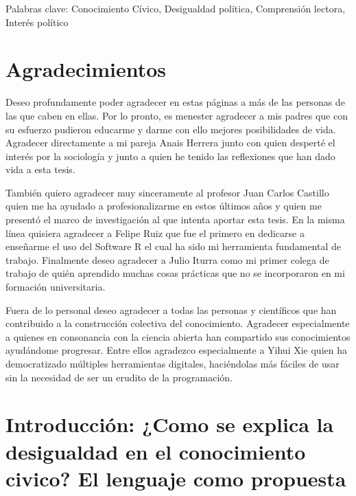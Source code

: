 \documentclass[12pt,twoside]{templates/facsothesis}
\begin{document}
Palabras clave: Conocimiento Cívico, Desigualdad política, Comprensión lectora, Interés político

\hypertarget{agradecimientos}{%
\chapter*{Agradecimientos}\label{agradecimientos}}

Deseo profundamente poder agradecer en estas páginas a más de las personas de las que caben en ellas. Por lo pronto, es menester agradecer a mis padres que con su esfuerzo pudieron educarme y darme con ello mejores posibilidades de vida.
Agradecer directamente a mi pareja Anais Herrera junto con quien desperté el interés por la sociología y junto a quien he tenido las reflexiones que han dado vida a esta tesis.

También quiero agradecer muy sinceramente al profesor Juan Carlos Castillo quien me ha ayudado a profesionalizarme en estos últimos años y quien me presentó el marco de investigación al que intenta aportar esta tesis. En la misma línea quisiera agradecer a Felipe Ruiz que fue el primero en dedicarse a enseñarme el uso del Software R el cual ha sido mi herramienta fundamental de trabajo. Finalmente deseo agradecer a Julio Iturra como mi primer colega de trabajo de quién aprendido muchas cosas prácticas que no se incorporaron en mi formación universitaria.

Fuera de lo personal deseo agradecer a todas las personas y científicos que han contribuido a la construcción colectiva del conocimiento. Agradecer especialmente a quienes en consonancia con la ciencia abierta han compartido sus conocimientos ayudándome progresar. Entre ellos agradezco especialmente a Yihui Xie quien ha democratizado múltiples herramientas digitales, haciéndolas más fáciles de usar sin la necesidad de ser un erudito de la programación.

\hypertarget{introducciuxf3n-como-se-explica-la-desigualdad-en-el-conocimiento-civico-el-lenguaje-como-propuesta}{%
\chapter{Introducción: ¿Como se explica la desigualdad en el conocimiento civico? El lenguaje como propuesta}\label{introducciuxf3n-como-se-explica-la-desigualdad-en-el-conocimiento-civico-el-lenguaje-como-propuesta}}
\end{document}
